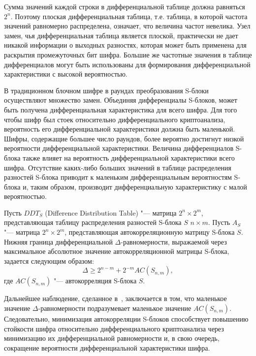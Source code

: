 Сумма значений каждой строки в дифференциальной таблице должна равняться $2^n$.
Поэтому плоская дифференциальная таблица, т.е. таблица, в которой частота
значений равномерно распределена, означает, что величина частот невелика. Узел
замен, чья дифференциальная таблица является плоской, практически не дает
никакой информации о выходных разностях, которая может быть применена для
раскрытия промежуточных бит шифра. Большие же частотные значения в таблице
дифференциалов могут быть использованы для формирования дифференциальной
характеристики с высокой вероятностью.

В традиционном блочном шифре в раундах преобразования S-блоки осуществляют
множество замен. Объединяя дифференциалы S-блоков, может быть получена
дифференциальная характеристика для всего шифра. Для того чтобы шифр был стоек
относительно дифференциального криптоанализа, вероятность его дифференциальной
характеристики должна быть маленькой. Шифры, содержащие большее число раундов,
более вероятно достигнут низкой вероятности дифференциальной характеристики.
Величина дифференциалов S-блока также влияет на вероятность дифференциальной
характеристики всего шифра. Отсутствие каких-либо больших значений в таблице
распределения разностей S-блока приводит к маленьким дифференциальным
вероятностям S-блока и, таким образом, производит дифференциальную
характеристику с малой вероятностью.

Пусть $DDT_S$ (Difference Distribution Table) "--- матрица $2^n \times 2^m$,
представляющая таблицу распределения разностей S-блока $S$ $n \times m$. Пусть
$A_S$ "--- матрица $2^n \times 2^m$, представляющая автокорреляционную матрицу
S-блока $S$. Нижняя граница дифференциальной $\Delta$-равномерности, выражаемой
через максимальное абсолютное значение автокорреляционной матрицы S-блока,
задается следующим образом:
\begin{equation}\Delta \geq 2^{n - m} + 2^{-m} AC(S_{n,m}),\end{equation}
где $AC(S_{n,m})$ "--- автокорреляция S-блока $S$.

Дальнейшее наблюдение, сделанное в~\cite{Burnett}, заключается в том, что
маленькое значение $\Delta$-равномерности подразумевает маленькое значение
$AC(S_{n,m})$. Следовательно, минимизация автокорреляции S-блоков способствует
повышению стойкости шифра относительно дифференциального криптоанализа через
минимизацию их дифференциальной равномерности и, в свою очередь, сокращение
вероятности дифференциальной характеристики шифра.


